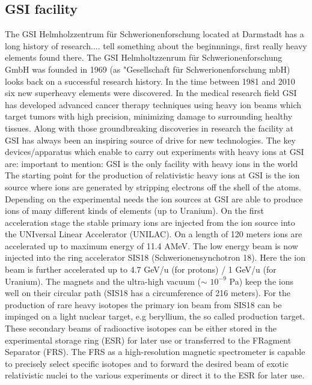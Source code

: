\subsection{GSI facility}
The GSI Helmholzzentrum f\"ur Schwerionenforschung located at Darmstadt has a long history of research.... tell something about the beginnnings, first really heavy elements found there.\newline
The GSI Helmholtzzenrum f\"ur Schwerionenforschung GmbH was founded in 1969 (as "Gesellschaft f\"ur Schwerionenforschung mbH) looks back on a successful research history. In the time between 1981 and 2010 six new  superheavy elements were discovered. \newline
In the medical research field GSI has developed advanced cancer therapy techniques using heavy ion beams which target tumors with high precision, minimizing damage to surrounding healthy tissues.\newline
Along with those groundbreaking discoveries in research the facility at GSI has always been an inspiring source of drive for new technologies.\newline
The key devices/apparatus which enable to carry out experiments with heavy ions at GSI are:
important to mention: GSI is the only facility with heavy ions in the world
The starting point for the production of relativistic heavy ions at GSI is the ion source where ions are generated by stripping electrons off the shell of the atoms. Depending on the experimental needs the ion sources at GSI are able to produce ions of many different kinds of elements (up to Uranium).\newline
On the first acceleration stage the stable primary ions are injected from the ion source into the UNIversal Linear Accelerator (UNILAC). On a length of 120 meters ions are accelerated up to maximum energy of 11.4 AMeV. The low energy beam is now injected into the ring accelerator SIS18 (Schwerionensynchotron 18). Here the ion beam is further accelerated up to 4.7 GeV/u (for protons) / 1 GeV/u (for Uranium). The magnets and  the ultra-high vacuum ($\sim$ $10^{-9}$ Pa) keep the ions well on their circular path (SIS18 has a circumference of 216 meters). For the production of rare heavy isotopes the primary ion beam from SIS18 can be impinged on a light nuclear target, e.g beryllium, the so called production target. These secondary beams of radioactive isotopes can be either stored in the experimental storage ring (ESR) for later use or transferred to the FRagment Separator (FRS). The FRS as a high-resolution magnetic spectrometer is capable to precisely select specific isotopes and to forward the desired beam of exotic relativistic nuclei to the various experiments or direct it to the ESR for later use.\newline

